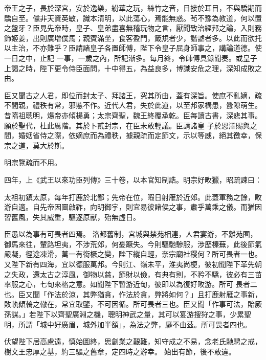 \begin{pinyinscope}
 帝王之子，長於深宮，安於逸樂，紛華之玩，絲竹之音，日接於耳目，不與驕期而驕自至。儻非天資英敏，識本清明，以此蕩心，焉能無惑。茍不豫為教道，何以置之盤牙？臣見先帝時，皇子、皇弟盡喜無稽玩物之言，厭聞致治經邦之論，入則務飾姬姜，出則廣增僕馬；親賓滿坐，食客盈門，箴規者少，諧謔者多。以此而欲托以主治，不亦難乎？臣請諸皇子各置師傅，陛下令皇子屈身師事之，講論道德。使一日之中，止記
 一事，一歲之內，所記漸多。每月終，令師傅具錄聞奏。或皇子上謁之時，陛下更令侍臣面問，十中得五，為益良多，博識安危之理，深知成敗之由。



 臣又聞古之人君，即位而封太子、拜諸王，究其所由，蓋有深旨。使庶不亂嫡，疏不間親，禮秩有常，邪慝不作。近代人君，失於此道，以至邦家構患，釁隙萌生。昔隋祖聰明，煬帝亦傾楊勇；太宗齊聖，魏王終覆承乾。臣每讀古書，深悲其事。願於聖代，杜此厲階。其於卜貳封宗，在臣未敢輕議。臣請諸皇
 子於恩澤賜與之間，婚姻省侍之際，依嫡庶而為禮秩，據親疏而定節文，示以等威，絕其徼幸，保宗之道，莫大於斯。



 明宗覽疏而不用。



 四年，上《武王以來功臣列傳》三十卷，以本官知制誥。明宗好畋獵，昭疏諫曰：



 太祖初鎮太原，每年打鹿於北鄙；先帝在位，暇日射雁於近郊。此蓋軍務之餘，畋游自適。自先帝因圖啟祚，向明御宇，則宜易彼諸侯之事，肅乎萬乘之儀。而猶因習舊風，失其威重，驅逐原獸，殆無虛日。



 臣愚以為事有可畏者四焉。
 洛都舊制，宮城與禁苑相連，人君宴游，不離苑囿，御馬來往，輦路坦夷，不涉荒郊，何憂蹶失。今則驅馳驂服，涉歷榛蕪，此後節氣嚴凝，徑途凍滑，萬一有銜橛之變，陛下縱自輕，奈宗廟社稷何？所可畏者一也。又陛下新有四海，宜以德服萬邦。今則江、嶺未平，淮夷尚梗，彼初聞陛下革先朝之失政，還太古之淳風，御物以慈，節財以儉，有典有則，不矜不驕，彼必有三苗率服之心，七旬來格之意。如聞陛下暫游近甸，彼即以為復好畋游。所可
 畏者二也。臣又聞「作法於涼，其弊猶貪，作法於貪，弊將如何？」且打鹿射雁之事新，敗軌傾輈之轍在，常宜取鑒，不可因循。所可畏者三也。臣又聞「作事可法，貽厥孫謀。」若陛下以齊聖廣淵之機，聰明神武之量，其可以宴游搜狩之事，少累聖明，所謂「城中好廣眉，城外加半額」，為法之弊，靡不由茲。所可畏者四也。



 伏望陛下居高慮遠，慎始圖終，思創業之艱難，知守成之不易，念老氏馳騁之戒，樹文王忠厚之基，約三驅之舊章，定四時之游幸。
 始出有節，後不敢違。




\end{pinyinscope}
